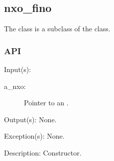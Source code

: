 %
%
%
%
%

\subsection{nxo\_fino}
\label{nxo_fino}

The  class is a subclass of the  class.

\subsubsection{API}
\begin{capi}
\label{nxo_fino_new}
	\begin{capilist}
	\item[Input(s): ]
		\begin{description}\item[]
		\item[a\_nxo: ]
			Pointer to an .
		\end{description}
	\item[Output(s): ] None.
	\item[Exception(s): ] None.
	\item[Description: ]
		Constructor.
	\end{capilist}
\end{capi}

